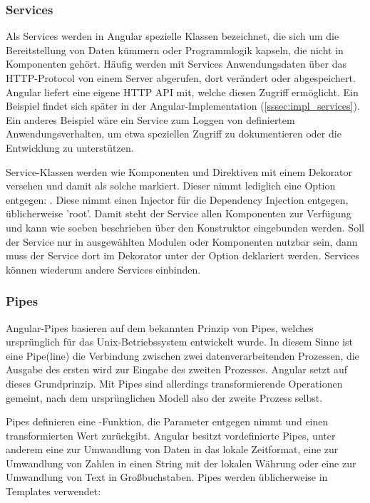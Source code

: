 \subsubsection{Services}
Als Services werden in Angular spezielle Klassen bezeichnet, die sich um die Bereitstellung von Daten kümmern oder Programmlogik kapseln, die nicht in Komponenten gehört. Häufig werden mit Services Anwendungsdaten über das HTTP-Protocol von einem Server abgerufen, dort verändert oder abgespeichert. Angular liefert eine eigene HTTP API mit, welche diesen Zugriff ermöglicht. Ein Beispiel findet sich später in der Angular-Implementation (\ref{sssec:impl_services}).
Ein anderes Beispiel wäre ein Service zum Loggen von definiertem Anwendungsverhalten, um etwa speziellen Zugriff zu dokumentieren oder die Entwicklung zu unterstützen.

Service-Klassen werden wie Komponenten und Direktiven mit einem Dekorator versehen und damit als solche markiert. Dieser nimmt lediglich eine Option entgegen: . Diese nimmt einen Injector für die Dependency Injection entgegen, üblicherweise 'root'. Damit steht der Service allen Komponenten zur Verfügung und kann wie soeben beschrieben über den Konstruktor eingebunden werden. Soll der Service nur in ausgewählten Modulen oder Komponenten nutzbar sein, dann muss der Service dort im Dekorator unter der Option  deklariert werden. Services können wiederum andere Services einbinden.\cite{Services}

\subsubsection{Pipes}\label{ssec:pipes}
Angular-Pipes basieren auf dem bekannten Prinzip von Pipes, welches ursprünglich für das Unix-Betriebssystem entwickelt wurde. In diesem Sinne ist eine Pipe(line) die Verbindung zwischen zwei datenverarbeitenden Prozessen, die Ausgabe des ersten wird zur Eingabe des zweiten Prozesses. Angular setzt auf dieses Grundprinzip. Mit Pipes sind allerdings transformierende Operationen gemeint, nach dem ursprünglichen Modell also der zweite Prozess selbst.

Pipes definieren eine -Funktion, die Parameter entgegen nimmt und einen transformierten Wert zurückgibt. Angular besitzt vordefinierte Pipes, unter anderem eine  zur Umwandlung von Daten in das lokale Zeitformat, eine  zur Umwandlung von Zahlen in einen String mit der lokalen Währung oder eine  zur Umwandlung von Text in Großbuchstaben. Pipes werden üblicherweise in Templates verwendet\cite{AngularPipes}:

